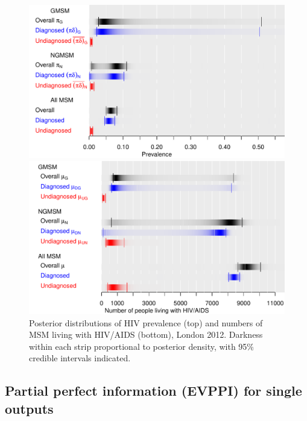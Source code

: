 \documentclass[12pt]{article}\usepackage[]{graphicx}\usepackage[]{color}
\makeatletter
\def\maxwidth{ %
  \ifdim\Gin@nat@width>\linewidth
    \linewidth
  \else
    \Gin@nat@width
  \fi
}
\newenvironment{knitrout}{}{} %
\makeatother
\begin{document}
\begin{figure}

\begin{knitrout}
\color{fgcolor}
\includegraphics[width=\maxwidth]{figure/prevnums-1} 

\includegraphics[width=\maxwidth]{figure/prevnums-2} 

\end{knitrout}
  \caption{Posterior distributions of HIV prevalence (top) and numbers of MSM living with HIV/AIDS (bottom), London 2012. Darkness within each strip proportional to posterior density, with 95\% credible intervals indicated.}
  \label{fig:res:prev}
\end{figure}

\subsection{Partial perfect information (EVPPI) for single outputs}
\end{document}
